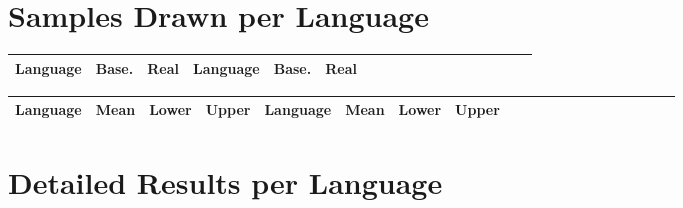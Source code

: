 \documentclass[11pt,letterpaper]{article}
\begin{document}
\section{Samples Drawn per Language}

\begin{center}
\begin{longtable}{l|ll||l|llllllllllllll}
	Language & Base. & Real & Language & Base. & Real \\ \hline

\end{longtable}
	\label{tab:samples}
\end{center}



\begin{center}
\begin{longtable}{l|lll||l|lllllllllllllll}
	Language & Mean & Lower & Upper & Language & Mean & Lower & Upper \\ \hline

\end{longtable}
	\label{tab:boot-g}
\end{center}


\section{Detailed Results per Language}
\end{document}
